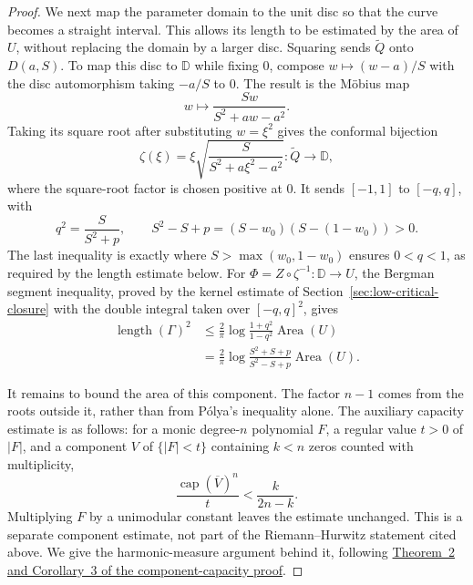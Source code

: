 \begin{proof}
We next map the parameter domain to the unit disc so that the curve
becomes a straight interval. This allows its length to be estimated by
the area of $U$, without replacing the domain by a larger disc.
Squaring sends $\widetilde Q$ onto $D(a,S)$. To map this disc to
$\mathbb D$ while fixing $0$, compose $w\mapsto(w-a)/S$ with the disc
automorphism taking $-a/S$ to $0$. The result is the M\"obius map
\[
 w\longmapsto\frac{Sw}{S^2+aw-a^2}.
\]
Taking its square root after substituting $w=\xi^2$ gives the conformal
bijection
\[
 \zeta(\xi)=\xi\sqrt{\frac{S}{S^2+a\xi^2-a^2}}
     :\widetilde Q\longrightarrow\mathbb D,
\]
where the square-root factor is chosen positive at $0$. It sends
$[-1,1]$ to $[-q,q]$, with
\[
 q^2=\frac{S}{S^2+p},\qquad
 S^2-S+p=(S-w_0)(S-(1-w_0))>0.
\]
The last inequality is exactly where $S>\max(w_0,1-w_0)$ ensures
$0<q<1$, as required by the length estimate below.
For $\Phi=Z\circ\zeta^{-1}:\mathbb D\to U$, the Bergman segment inequality,
proved by the kernel estimate of Section~\ref{sec:low-critical-closure} with
the double integral taken over $[-q,q]^2$, gives
\begin{align*}
 \operatorname{length}(\Gamma)^2
 &\le \frac2\pi\log\frac{1+q^2}{1-q^2}
       \operatorname{Area}(U)\\
 &=\frac2\pi\log\frac{S^2+S+p}{S^2-S+p}
       \operatorname{Area}(U).                       \tag{7}
\end{align*}

It remains to bound the area of this component. The factor $n-1$ comes
from the roots outside it, rather than from P\'olya's inequality alone.
The auxiliary capacity estimate is as follows: for a monic degree-$n$
polynomial $F$, a regular value $t>0$ of $|F|$, and a component $V$ of
$\{|F|<t\}$ containing $k<n$ zeros counted with multiplicity,
\[
 \frac{\operatorname{cap}(\overline V)^n}{t}<\frac{k}{2n-k}.
\]
Multiplying $F$ by a unimodular constant leaves the estimate unchanged.
This is a separate component estimate, not part of the
Riemann--Hurwitz statement cited above. We give the harmonic-measure
argument behind it, following
\href{https://github.com/wcook04/plectis-erdos/blob/8efbccc235df64a38d83f5dc7b1949e2ad18270d/research_corpus/Erdos1041/problem/ExteriorBlaschkeFibreCapacityGap.md}{Theorem~2 and Corollary~3 of the component-capacity proof}.


\end{proof}

